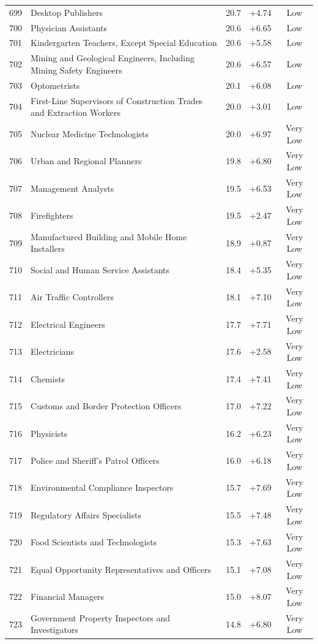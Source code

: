 {\begin{longtable}{rp{7cm}ccc}
699 & Desktop Publishers & 20.7 & +4.74 & Low \\
700 & Physician Assistants & 20.6 & +6.65 & Low \\
701 & Kindergarten Teachers, Except Special Education & 20.6 & +5.58 & Low \\
702 & Mining and Geological Engineers, Including Mining Safety Engineers & 20.6 & +6.57 & Low \\
703 & Optometrists & 20.1 & +6.08 & Low \\
704 & First-Line Supervisors of Construction Trades and Extraction Workers & 20.0 & +3.01 & Low \\
705 & Nuclear Medicine Technologists & 20.0 & +6.97 & Very Low \\
706 & Urban and Regional Planners & 19.8 & +6.80 & Very Low \\
707 & Management Analysts & 19.5 & +6.53 & Very Low \\
708 & Firefighters & 19.5 & +2.47 & Very Low \\
709 & Manufactured Building and Mobile Home Installers & 18.9 & +0.87 & Very Low \\
710 & Social and Human Service Assistants & 18.4 & +5.35 & Very Low \\
711 & Air Traffic Controllers & 18.1 & +7.10 & Very Low \\
712 & Electrical Engineers & 17.7 & +7.71 & Very Low \\
713 & Electricians & 17.6 & +2.58 & Very Low \\
714 & Chemists & 17.4 & +7.41 & Very Low \\
715 & Customs and Border Protection Officers & 17.0 & +7.22 & Very Low \\
716 & Physicists & 16.2 & +6.23 & Very Low \\
717 & Police and Sheriff's Patrol Officers & 16.0 & +6.18 & Very Low \\
718 & Environmental Compliance Inspectors & 15.7 & +7.69 & Very Low \\
719 & Regulatory Affairs Specialists & 15.5 & +7.48 & Very Low \\
720 & Food Scientists and Technologists & 15.3 & +7.63 & Very Low \\
721 & Equal Opportunity Representatives and Officers & 15.1 & +7.08 & Very Low \\
722 & Financial Managers & 15.0 & +8.07 & Very Low \\
723 & Government Property Inspectors and Investigators & 14.8 & +6.80 & Very Low \\

\end{longtable}}
